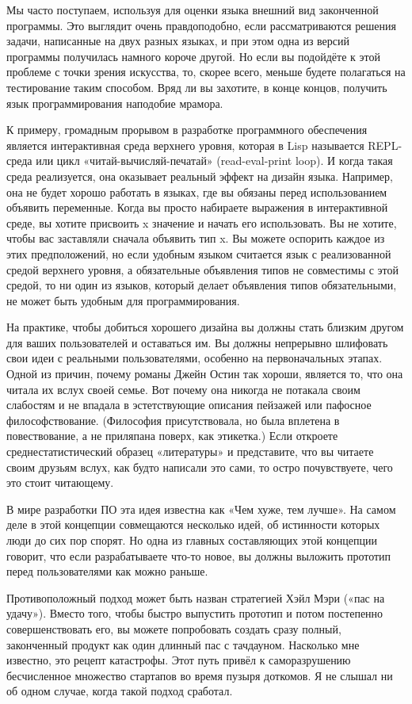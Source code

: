 \documentclass[ebook,12pt,oneside,openany]{memoir}
\begin{document}
Мы часто поступаем, используя для оценки языка внешний вид законченной
программы. Это выглядит очень правдоподобно, если рассматриваются
решения задачи, написанные на двух разных языках, и при этом одна из
версий программы получилась намного короче другой. Но если вы
подойдёте к этой проблеме с точки зрения искусства, то, скорее всего,
меньше будете полагаться на тестирование таким способом. Вряд ли вы
захотите, в конце концов, получить язык программирования наподобие
мрамора.

К примеру, громадным прорывом в разработке программного обеспечения
является интерактивная среда верхнего уровня, которая в Lisp
называется REPL-среда или цикл «читай-вычисляй-печатай»
(read-eval-print loop). И когда такая среда реализуется, она оказывает
реальный эффект на дизайн языка. Например, она не будет хорошо
работать в языках, где вы обязаны перед использованием объявить
переменные. Когда вы просто набираете выражения в интерактивной среде,
вы хотите присвоить x значение и начать его использовать. Вы не
хотите, чтобы вас заставляли сначала объявить тип x. Вы можете
оспорить каждое из этих предположений, но если удобным языком
считается язык с реализованной средой верхнего уровня, а обязательные
объявления типов не совместимы с этой средой, то ни один из языков,
который делает объявления типов обязательными, не может быть удобным
для программирования.

На практике, чтобы добиться хорошего дизайна вы должны стать близким
другом для ваших пользователей и оставаться им. Вы должны непрерывно
шлифовать свои идеи с реальными пользователями, особенно на
первоначальных этапах. Одной из причин, почему романы Джейн Остин так
хороши, является то, что она читала их вслух своей семье. Вот почему
она никогда не потакала своим слабостям и не впадала в эстетствующие
описания пейзажей или пафосное философствование. (Философия
присутствовала, но была вплетена в повествование, а не приляпана
поверх, как этикетка.) Если откроете среднестатистический образец
«литературы» и представите, что вы читаете своим друзьям вслух, как
будто написали это сами, то остро почувствуете, чего это стоит
читающему.

В мире разработки ПО эта идея известна как «Чем хуже, тем лучше». На
самом деле в этой концепции совмещаются несколько идей, об истинности
которых люди до сих пор спорят. Но одна из главных составляющих этой
концепции говорит, что если разрабатываете что-то новое, вы должны
выложить прототип перед пользователями как можно раньше.

Противоположный подход может быть назван стратегией Хэйл Мэри («пас на
удачу»). Вместо того, чтобы быстро выпустить прототип и потом
постепенно совершенствовать его, вы можете попробовать создать сразу
полный, законченный продукт как один длинный пас с тачдауном.
Насколько мне известно, это рецепт катастрофы. Этот путь привёл к
саморазрушению бесчисленное множество стартапов во время пузыря
доткомов. Я не слышал ни об одном случае, когда такой подход сработал.
\end{document}

